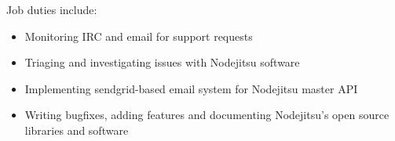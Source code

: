 \normalsize
Job duties include:
\small
\begin{itemize}
    \item Monitoring IRC and email for support requests
    \item Triaging and investigating issues with Nodejitsu software
    \item Implementing sendgrid-based email system for Nodejitsu master API
    \item Writing bugfixes, adding features and documenting Nodejitsu's open source libraries and software
\end{itemize}
\normalsize
\medskip
